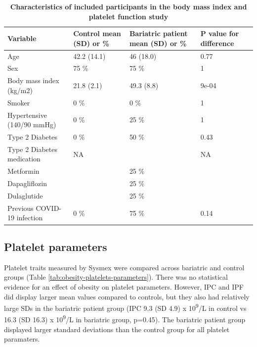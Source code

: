 \documentclass[11pt,twoside]{bristolthesis}
\begin{document}
\begin{table}

\caption[Characteristics of included participants in the body mass index and platelet function study]{\label{tab:obesity-platelets-participants}\textbf{Characteristics of included participants in the body mass index and platelet function study}}
\centering
\begin{tabu} to 
\toprule
Variable & Control mean (SD) or \% & Bariatric patient mean (SD) or \% & P value for difference\\
\midrule
Age & 42.2 (14.1) & 46 (18.0) & 0.77\\
Sex & 75 \% & 75 \% & 1\\
Body mass index (kg/m2) & 21.8 (2.1) & 49.3 (8.8) & 9e-04\\
Smoker & 0 \% & 0 \% & 1\\
Hypertensive (140/90 mmHg) & 0 \% & 25 \% & 1\\
\addlinespace
Type 2 Diabetes & 0 \% & 50 \% & 0.43\\
Type 2 Diabetes medication & NA &  & NA\\
\hspace{1em}Metformin &  & 25 \% & \\
\hspace{1em}Dapagliflozin &  & 25 \% & \\
\hspace{1em}Dulaglutide &  & 25 \% & \\
\addlinespace
Previous COVID-19 infection & 0 \% & 75 \% & 0.14\\
\bottomrule
\end{tabu}
\end{table}
\hypertarget{platelet-parameters}{%
\subsection{Platelet parameters}\label{platelet-parameters}}

Platelet traits measured by Sysmex were compared across bariatric and control groups (Table \ref{tab:obesity-platelets-parameters}). There was no statistical evidence for an effect of obesity on platelet parameters. However, IPC and IPF did display larger mean values compared to controls, but they also had relatively large SDs in the bariatric patient group (IPC 9.3 (SD 4.9) x 10\textsuperscript{9}/L in control vs 16.3 (SD 16.3) x 10\textsuperscript{9}/L in bariatric group, p=0.45). The bariatric patient group displayed larger standard deviations than the control group for all platelet paramaters.
\end{document}
